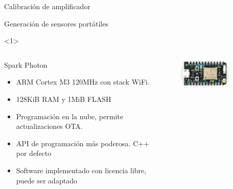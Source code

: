 \begin{frame}{Calibración de amplificador}
\end{frame}

\begin{frame}{Generación de sensores portátiles}
    \begin{onlyenv}<1>
        \begin{columns}[c]
            \begin{column}{.5\textwidth}
            Spark Photon
            \begin{itemize}
                \item ARM Cortex M3 120MHz con stack WiFi. 
                \item 128KiB RAM y 1MiB FLASH
                \item Programación en la nube, permite actualizaciones OTA.
                \item API de programación más poderosa. C++ por defecto
                \item Software implementado con licencia libre, puede ser adaptado
            \end{itemize}
            \end{column}

            \begin{column}{.5\textwidth}
                \vspace{-2em}
                \begin{figure}
                    \includegraphics[width=0.8\textwidth]{fig/circuito/photon}
                    \label{fig:circuito/photon}
                \end{figure}
                
            \end{column}
        \end{columns}
    \end{onlyenv}


\end{frame}
